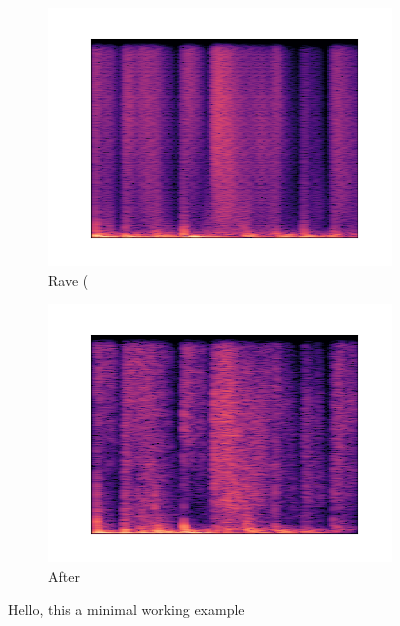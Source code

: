 \documentclass{article}
\begin{document}
\begin{figure}
\begin{subfigure}[b]{0.2\textwidth}
\centering
\includegraphics[width=\textwidth]{examples/rave_vae.wav.png}
\caption{Rave (}
\end{subfigure} \hfill

\begin{subfigure}[b]{0.2\textwidth}
\centering
\includegraphics[width=\textwidth]{examples/rave.wav.png}
\caption{After}
\end{subfigure}

\caption[Hello]{Hello, this a minimal working example}
\end{figure}

\end{document}
